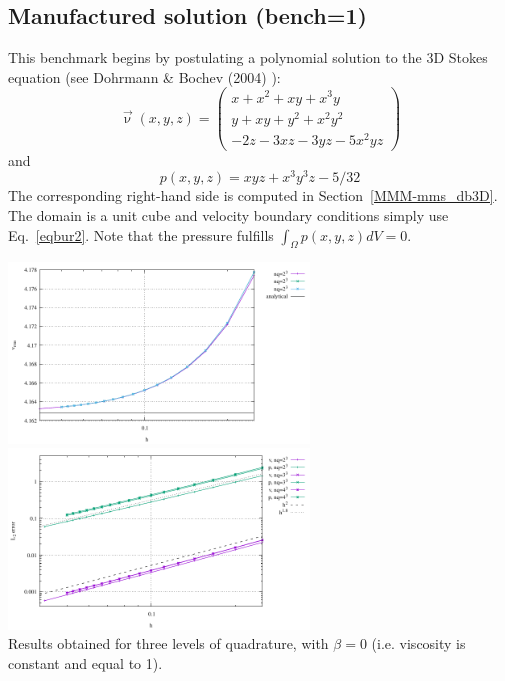 \subsection*{Manufactured solution (bench=1)}

This benchmark begins by postulating a polynomial solution 
to the 3D Stokes equation (see Dohrmann \& Bochev (2004) \cite{dobo04}):
\begin{equation}
\vec{\upnu}(x,y,z)
=
\left(
\begin{array}{c}
x+x^2+xy+x^3y \\
y + xy + y^2 + x^2 y^2\\
-2z - 3xz - 3yz - 5x^2 yz
\end{array}
\right)
\label{eqbur2}
\end{equation}
and
\begin{equation}
p(x,y,z) = xyz + x^3 y^3z - 5/32
\end{equation}
The corresponding right-hand side is computed in Section~\ref{MMM-mms_db3D}.
The domain is a unit cube and velocity boundary conditions
simply use Eq.~\eqref{eqbur2}.
Note that the pressure fulfills $\int_\Omega p(x,y,z) dV = 0.$

\begin{center}
\includegraphics[width=8cm]{python_codes/fieldstone_82/RESULTS/bench1/vrms.pdf}
\includegraphics[width=8cm]{python_codes/fieldstone_82/RESULTS/bench1/conv.pdf}\\
{\captionfont Results obtained for three levels of quadrature, with $\beta=0$ (i.e.
viscosity is constant and equal to 1).}
\end{center}

